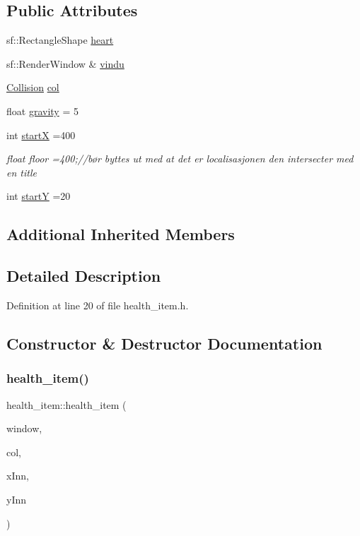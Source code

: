 \subsection*{Public Attributes}
\begin{DoxyCompactItemize}
\item 
sf\+::\+Rectangle\+Shape \hyperlink{classhealth__item_a199636ed174bbbca7fee42dffbc3fd86}{heart}
\item 
sf\+::\+Render\+Window \& \hyperlink{classhealth__item_ab502a99715215a683861ce27258dcc7d}{vindu}
\item 
\hyperlink{class_collision}{Collision} \hyperlink{classhealth__item_a9abffa822bf114c7a57f8516deefeb57}{col}
\item 
float \hyperlink{classhealth__item_af36b663f6a9950d15be362d964bdde40}{gravity} = 5
\item 
int \hyperlink{classhealth__item_a23c7b1b11d688e48504c21d52b7d9fdf}{startX} =400
\begin{DoxyCompactList}\small\item\em float floor =400;//bør byttes ut med at det er localisasjonen den intersecter med en title \end{DoxyCompactList}\item 
int \hyperlink{classhealth__item_a4f3840b30f8526f3d8d9ea1823c1e406}{startY} =20
\end{DoxyCompactItemize}
\subsection*{Additional Inherited Members}


\subsection{Detailed Description}


Definition at line 20 of file health\+\_\+item.\+h.



\subsection{Constructor \& Destructor Documentation}
\hypertarget{classhealth__item_a518db4a537e9102a4fe0b9f18ab3de91}{}\label{classhealth__item_a518db4a537e9102a4fe0b9f18ab3de91} 
\subsubsection{\texorpdfstring{health\+\_\+item()}{health\_item()}}
{\footnotesize\ttfamily health\+\_\+item\+::health\+\_\+item (\begin{DoxyParamCaption}\item[{sf\+::\+Render\+Window \&}]{window,  }\item[{\hyperlink{class_collision}{Collision}}]{col,  }\item[{int}]{x\+Inn,  }\item[{int}]{y\+Inn }\end{DoxyParamCaption})}



